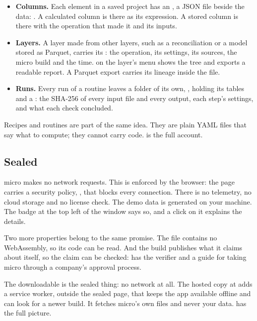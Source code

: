 \begin{itemize}
\item \textbf{Columns.} Each element in a saved project has an , a JSON file beside the data: . A calculated column is there as its expression. A stored column is there with the operation that made it and its inputs.
\item \textbf{Layers.} A layer made from other layers, such as a reconciliation or a model stored as Parquet, carries its : the operation, its settings, its sources, the micro build and the time.  on the layer's menu shows the tree and exports a readable report. A Parquet export carries its lineage inside the file.
\item \textbf{Runs.} Every run of a routine leaves a folder of its own, , holding its tables and a : the SHA-256 of every input file and every output, each step's settings, and what each check concluded.
\end{itemize}

Recipes and routines are part of the same idea. They are plain YAML files that say what to compute; they cannot carry code.  is the full account.

\subsection{Sealed}\label{sec:micro-sealed}
micro makes no network requests. This is enforced by the browser: the page carries a security policy, , that blocks every connection. There is no telemetry, no cloud storage and no license check. The demo data is generated on your machine. The  badge at the top left of the window says so, and a click on it explains the details.

Two more properties belong to the same promise. The file contains no WebAssembly, so its code can be read. And the build publishes what it claims about itself, so the claim can be checked:  has the verifier and a guide for taking micro through a company's approval process.

\begin{note}
The downloadable  is the sealed thing: no network at all. The hosted copy at  adds a service worker, outside the sealed page, that keeps the app available offline and can look for a newer build. It fetches micro's own files and never your data.  has the full picture.
\end{note}

